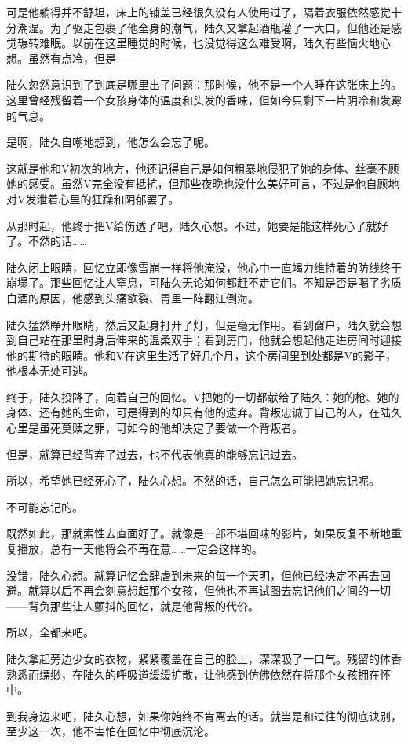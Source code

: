 可是他躺得并不舒坦，床上的铺盖已经很久没有人使用过了，隔着衣服依然感觉十分潮湿。为了驱走包裹了他全身的潮气，陆久又拿起酒瓶灌了一大口，但他还是感觉辗转难眠。以前在这里睡觉的时候，也没觉得这么难受啊，陆久有些恼火地心想。虽然有点冷，但是——

陆久忽然意识到了到底是哪里出了问题：那时候，他不是一个人睡在这张床上的。这里曾经残留着一个女孩身体的温度和头发的香味，但如今只剩下一片阴冷和发霉的气息。

是啊，陆久自嘲地想到，他怎么会忘了呢。

这就是他和V初次的地方，他还记得自己是如何粗暴地侵犯了她的身体、丝毫不顾她的感受。虽然V完全没有抵抗，但那些夜晚也没什么美好可言，不过是他自顾地对V发泄着心里的狂躁和阴郁罢了。

从那时起，他终于把V给伤透了吧，陆久心想。不过，她要是能这样死心了就好了。不然的话……

陆久闭上眼睛，回忆立即像雪崩一样将他淹没，他心中一直竭力维持着的防线终于崩塌了。那些回忆让人窒息，可陆久无论如何都赶不走它们。不知是否是喝了劣质白酒的原因，他感到头痛欲裂、胃里一阵翻江倒海。

陆久猛然睁开眼睛，然后又起身打开了灯，但是毫无作用。看到窗户，陆久就会想到自己站在那里时身后伸来的温柔双手；看到房门，他就会想起他走进房间时迎接他的期待的眼睛。他和V在这里生活了好几个月，这个房间里到处都是V的影子，他根本无处可逃。

终于，陆久投降了，向着自己的回忆。V把她的一切都献给了陆久：她的枪、她的身体、还有她的生命，可是得到的却只有他的遗弃。背叛忠诚于自己的人，在陆久心里是虽死莫赎之罪，可如今的他却决定了要做一个背叛者。

但是，就算已经背弃了过去，也不代表他真的能够忘记过去。

所以，希望她已经死心了，陆久心想。不然的话，自己怎么可能把她忘记呢。

不可能忘记的。

既然如此，那就索性去直面好了。就像是一部不堪回味的影片，如果反复不断地重复播放，总有一天他将会不再在意……一定会这样的。

没错，陆久心想。就算记忆会肆虐到未来的每一个天明，但他已经决定不再去回避。就算以后不再会刻意想起那个女孩，但他也不再试图去忘记他们之间的一切——背负那些让人颤抖的回忆，就是他背叛的代价。

所以，全都来吧。

陆久拿起旁边少女的衣物，紧紧覆盖在自己的脸上，深深吸了一口气。残留的体香熟悉而缥缈，在陆久的呼吸道缓缓扩散，让他感到仿佛依然在将那个女孩拥在怀中。

到我身边来吧，陆久心想，如果你始终不肯离去的话。就当是和过往的彻底诀别，至少这一次，他不害怕在回忆中彻底沉沦。